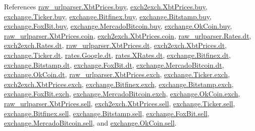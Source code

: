 References \hyperlink{raw__urlparser_8py_source_l00055}{raw\+\_\+urlparser.\+Xbt\+Prices.\+buy}, \hyperlink{exch2exch_8py_source_l00059}{exch2exch.\+Xbt\+Prices.\+buy}, \hyperlink{exchange_8py_source_l00060}{exchange.\+Ticker.\+buy}, \hyperlink{exchange_8py_source_l00430}{exchange.\+Bitfinex.\+buy}, \hyperlink{exchange_8py_source_l00502}{exchange.\+Bitstamp.\+buy}, \hyperlink{exchange_8py_source_l00574}{exchange.\+Fox\+Bit.\+buy}, \hyperlink{exchange_8py_source_l00642}{exchange.\+Mercado\+Bitcoin.\+buy}, \hyperlink{exchange_8py_source_l00707}{exchange.\+Ok\+Coin.\+buy}, \hyperlink{raw__urlparser_8py_source_l00057}{raw\+\_\+urlparser.\+Xbt\+Prices.\+coin}, \hyperlink{exch2exch_8py_source_l00065}{exch2exch.\+Xbt\+Prices.\+coin}, \hyperlink{raw__urlparser_8py_source_l00024}{raw\+\_\+urlparser.\+Rates.\+dt}, \hyperlink{exch2exch_8py_source_l00028}{exch2exch.\+Rates.\+dt}, \hyperlink{raw__urlparser_8py_source_l00053}{raw\+\_\+urlparser.\+Xbt\+Prices.\+dt}, \hyperlink{exch2exch_8py_source_l00057}{exch2exch.\+Xbt\+Prices.\+dt}, \hyperlink{exchange_8py_source_l00059}{exchange.\+Ticker.\+dt}, \hyperlink{rates_8py_source_l00089}{rates.\+Google.\+dt}, \hyperlink{rates_8py_source_l00145}{rates.\+X\+Rates.\+dt}, \hyperlink{exchange_8py_source_l00437}{exchange.\+Bitfinex.\+dt}, \hyperlink{exchange_8py_source_l00509}{exchange.\+Bitstamp.\+dt}, \hyperlink{exchange_8py_source_l00573}{exchange.\+Fox\+Bit.\+dt}, \hyperlink{exchange_8py_source_l00649}{exchange.\+Mercado\+Bitcoin.\+dt}, \hyperlink{exchange_8py_source_l00714}{exchange.\+Ok\+Coin.\+dt}, \hyperlink{raw__urlparser_8py_source_l00056}{raw\+\_\+urlparser.\+Xbt\+Prices.\+exch}, \hyperlink{exchange_8py_source_l00057}{exchange.\+Ticker.\+exch}, \hyperlink{exch2exch_8py_source_l00064}{exch2exch.\+Xbt\+Prices.\+exch}, \hyperlink{exchange_8py_source_l00424}{exchange.\+Bitfinex.\+exch}, \hyperlink{exchange_8py_source_l00499}{exchange.\+Bitstamp.\+exch}, \hyperlink{exchange_8py_source_l00567}{exchange.\+Fox\+Bit.\+exch}, \hyperlink{exchange_8py_source_l00639}{exchange.\+Mercado\+Bitcoin.\+exch}, \hyperlink{exchange_8py_source_l00704}{exchange.\+Ok\+Coin.\+exch}, \hyperlink{raw__urlparser_8py_source_l00054}{raw\+\_\+urlparser.\+Xbt\+Prices.\+sell}, \hyperlink{exch2exch_8py_source_l00058}{exch2exch.\+Xbt\+Prices.\+sell}, \hyperlink{exchange_8py_source_l00061}{exchange.\+Ticker.\+sell}, \hyperlink{exchange_8py_source_l00431}{exchange.\+Bitfinex.\+sell}, \hyperlink{exchange_8py_source_l00503}{exchange.\+Bitstamp.\+sell}, \hyperlink{exchange_8py_source_l00575}{exchange.\+Fox\+Bit.\+sell}, \hyperlink{exchange_8py_source_l00643}{exchange.\+Mercado\+Bitcoin.\+sell}, and \hyperlink{exchange_8py_source_l00708}{exchange.\+Ok\+Coin.\+sell}.


